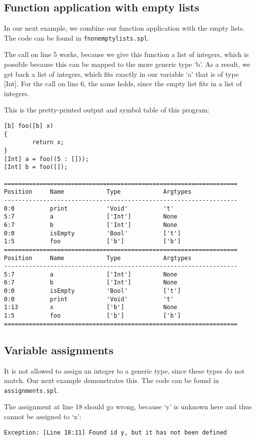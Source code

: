 \documentclass[a4paper]{article}
\begin{document}
\subsection{Function application with empty lists}
In our next example, we combine our function application with the empty lists. The code can be found in {\tt fnonemptylists.spl}.

The call on line 5 works, because we give this function a list of integers, which is possible because this can be mapped to the more generic type `b'. As a result, we get back a list of integers, which fits exactly in our variable `a' that is of type [Int]. For the call on line 6, the same holds, since the empty list fits in a list of integers. 

This is the pretty-printed output and symbol table of this program: 
\begin{verbatim}
[b] foo([b] x)
{
        return x;
}
[Int] a = foo((5 : []));
[Int] b = foo([]);

==================================================================
Position     Name            Type            Argtypes            
------------------------------------------------------------------
0:0          print           'Void'          't'                 
5:7          a               ['Int']         None                
6:7          b               ['Int']         None                
0:0          isEmpty         'Bool'          ['t']               
1:5          foo             ['b']           ['b']               
==================================================================
Position     Name            Type            Argtypes            
------------------------------------------------------------------
5:7          a               ['Int']         None                
6:7          b               ['Int']         None                
0:0          isEmpty         'Bool'          ['t']               
0:0          print           'Void'          't'                 
1:13         x               ['b']           None                
1:5          foo             ['b']           ['b']               
==================================================================
\end{verbatim}

\subsection{Variable assignments}
\label{var-assign}
It is not allowed to assign an integer to a generic type, since these types do not match. Our next example demonstrates this. The code can be found in {\tt assignments.spl}. 

The assignment at line 18 should go wrong, because `y' is unknown here and thus cannot be assigned to `x':
\begin{verbatim}
Exception: [Line 18:11] Found id y, but it has not been defined
\end{verbatim}
\end{document}
